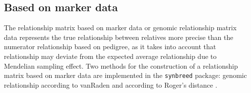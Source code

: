 \documentclass[a4paper,11pt]{article}
\begin{document}
\subsection{Based on marker data}

                 

The relationship matrix based on marker data or genomic relationship matrix data represents the true relationship between relatives
more precise than the numerator relationship based on pedigree, as it takes into account that relationship may deviate from the expected average relationship due to
Mendelian sampling effect.  Two methods for the construction of a relationship matrix based on marker data are implemented in the \texttt{synbreed} package: genomic relationship according to vanRaden \citep{vanRaden2008} and according to Roger's distance  \citep{Rogers1972}. 
\end{document}
